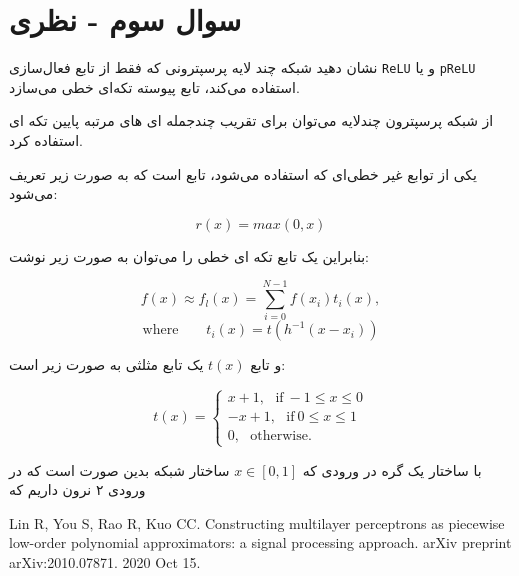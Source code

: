 \section{سوال سوم - نظری}

نشان دهید شبکه چند لایه پرسپترونی که فقط از تابع فعال‌سازی \texttt{ReLU} و یا \texttt{pReLU} استفاده می‌کند، تابع پیوسته تکه‌ای خطی می‌سازد.


\begin{qsolve}
از شبکه پرسپترون چند‌لایه می‌توان برای تقریب چند‌جمله ای های مرتبه پایین تکه ای استفاده کرد. \cite{ref1}

یکی از توابع غیر خطی‌ای که استفاده می‌شود، تابع  است که به صورت زیر تعریف می‌شود:

	$$ r(x)=max(0, x) $$
	
	بنابراین یک تابع تکه ای خطی را می‌توان به صورت زیر نوشت:
	
	$$ f(x)\approx f_l(x)=\sum_{i=0}^{N-1} f(x_i)t_i(x), $$
	$$ \text{where} \qquad t_i(x)=t(h^{-1}(x-x_i)) $$
	
	و تابع $t(x)$ یک تابع مثلثی به صورت زیر است:
	
	$$
	t(x)=
	\begin{cases}
		x+1, \ \ \  \text{if} \ -1\le x \le 0 \\
		-x+1, \ \ \ \text{if} \ 0\le x \le 1 \\
		0,     \ \ \ \text{otherwise.}
	\end{cases}
	$$
	
	با ساختار یک گره در ورودی که $x \in [0,1]$ ساختار شبکه بدین صورت است که در ورودی ۲ نرون داریم که 
	
\end{qsolve}

















\begin{latin}
	\begin{thebibliography}{9}
		Lin R, You S, Rao R, Kuo CC. Constructing multilayer perceptrons as piecewise low-order polynomial approximators: a signal processing approach. arXiv preprint arXiv:2010.07871. 2020 Oct 15.	
	\end{thebibliography} 
\end{latin}










